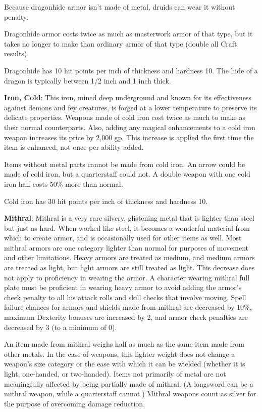 Because dragonhide armor isn't made of metal, druids can wear it without penalty.
	
Dragonhide armor costs twice as much as masterwork armor of that type, but it takes no longer to make than ordinary armor of that type (double all Craft results).
	
Dragonhide has 10 hit points per inch of thickness and hardness 10. The hide of a dragon is typically between 1/2 inch and 1 inch thick.
	
\textbf{Iron, Cold}: This iron, mined deep underground and known for its effectiveness against demons and fey creatures, is forged at a lower temperature to preserve its delicate properties. Weapons made of cold iron cost twice as much to make as their normal counterparts. Also, adding any magical enhancements to a cold iron weapon increases its price by 2,000 gp. This increase is applied the first time the item is enhanced, not once per ability added.
	
Items without metal parts cannot be made from cold iron. An arrow could be made of cold iron, but a quarterstaff could not. A double weapon with one cold iron half costs 50\% more than normal.
	
Cold iron has 30 hit points per inch of thickness and hardness 10.
	
\textbf{Mithral}: Mithral is a very rare silvery, glistening metal that is lighter than steel but just as hard. When worked like steel, it becomes a wonderful material from which to create armor, and is occasionally used for other items as well. Most mithral armors are one category lighter than normal for purposes of movement and other limitations. Heavy armors are treated as medium, and medium armors are treated as light, but light armors are still treated as light. This decrease does not apply to proficiency in wearing the armor. A character wearing mithral full plate must be proficient in wearing heavy armor to avoid adding the armor's check penalty to all his attack rolls and skill checks that involve moving. Spell failure chances for armors and shields made from mithral are decreased by 10\%, maximum Dexterity bonuses are increased by 2, and armor check penalties are decreased by 3 (to a minimum of 0).
	
An item made from mithral weighs half as much as the same item made from other metals. In the case of weapons, this lighter weight does not change a weapon's size category or the ease with which it can be wielded (whether it is light, one-handed, or two-handed). Items not primarily of metal are not meaningfully affected by being partially made of mithral. (A longsword can be a mithral weapon, while a quarterstaff cannot.) Mithral weapons count as silver for the purpose of overcoming damage reduction.
	
